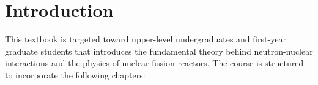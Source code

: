 
\tableofcontents

\clearpage
{}
\setcounter{page}{1}
\chapter*{Introduction}

This textbook is targeted toward upper-level undergraduates and first-year graduate students that introduces the fundamental theory behind neutron-nuclear interactions and the physics of nuclear fission reactors. The course is structured to incorporate the following chapters:
